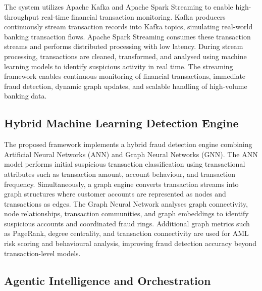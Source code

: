 \documentclass[conference]{IEEEtran}
\begin{document}
The system utilizes Apache Kafka and Apache Spark Streaming to enable high-throughput real-time financial transaction monitoring. Kafka producers continuously stream transaction records into Kafka topics, simulating real-world banking transaction flows. Apache Spark Streaming consumes these transaction streams and performs distributed processing with low latency. During stream processing, transactions are cleaned, transformed, and analysed using machine learning models to identify suspicious activity in real time. The streaming framework enables continuous monitoring of financial transactions, immediate fraud detection, dynamic graph updates, and scalable handling of high-volume banking data.

\subsection{Hybrid Machine Learning Detection Engine}

The proposed framework implements a hybrid fraud detection engine combining Artificial Neural Networks (ANN) and Graph Neural Networks (GNN). The ANN model performs initial suspicious transaction classification using transactional attributes such as transaction amount, account behaviour, and transaction frequency. Simultaneously, a graph engine converts transaction streams into graph structures where customer accounts are represented as nodes and transactions as edges. The Graph Neural Network analyses graph connectivity, node relationships, transaction communities, and graph embeddings to identify suspicious accounts and coordinated fraud rings. Additional graph metrics such as PageRank, degree centrality, and transaction connectivity are used for AML risk scoring and behavioural analysis, improving fraud detection accuracy beyond transaction-level models.

\subsection{Agentic Intelligence and Orchestration}
\end{document}
